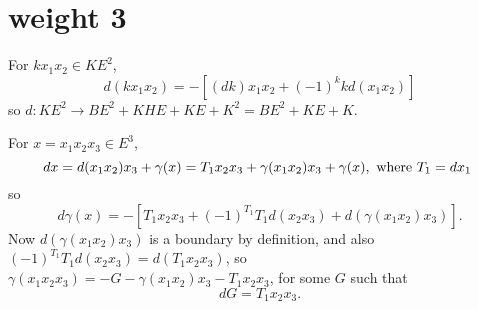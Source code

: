 \documentclass[11pt]{amsart}
\def\g{{\gamma}}
\begin{document}
\section{weight 3}
For $kx_1x_2\in KE^2$,
$$
d(kx_1x_2) = -[(dk)x_1x_2 + (-1)^k kd(x_1x_2)]
$$
so $d: KE^2 \to BE^2+KHE+KE+K^2 = BE^2+KE+K.$

For $x = x_1x_2x_3\in E^3$,
$$
dx = d(x_1x_2)x_3+\g(x) = T_1x_2x_3+\g(x_1x_2)x_3+\g(x), \hbox{ where $T_1 = dx_1$ }
$$
so
$$
d\g(x) = -[T_1x_2x_3 + (-1)^{T_1}T_1d(x_2x_3) + d(\g(x_1x_2)x_3)].
$$
Now $d(\g(x_1x_2)x_3)$ is a boundary by definition, and also $(-1)^{T_1}T_1d(x_2x_3) = d(T_1x_2x_3)$, so
 $\g(x_1x_2x_3) = -G-\g(x_1x_2)x_3-T_1x_2x_3$, for some $G$ such that
$$
dG = T_1x_2x_3.
$$
\end{document}
